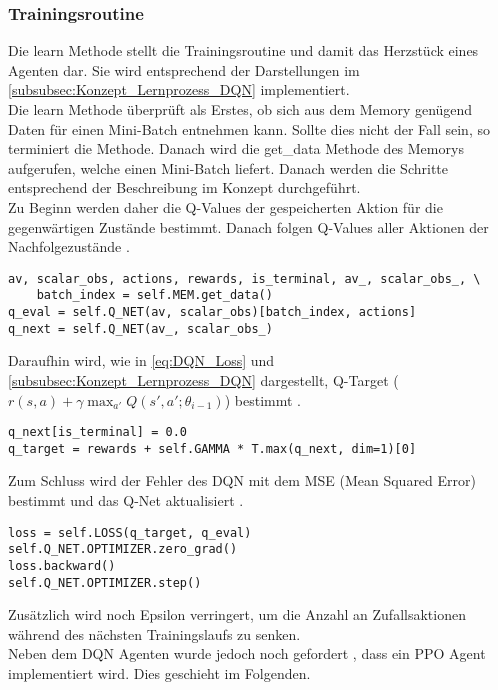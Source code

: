 \subsubsection{Trainingsroutine} \label{subsubsec:Implementierung_Trainingsroutine_DQN}
Die learn Methode stellt die Trainingsroutine und damit das Herzstück eines Agenten dar. Sie wird entsprechend der Darstellungen im \autoref{subsubsec:Konzept_Lernprozess_DQN} implementiert.\\
Die learn Methode überprüft als Erstes, ob sich aus dem Memory genügend Daten für einen Mini-Batch entnehmen kann. Sollte dies nicht der Fall sein, so terminiert die Methode.
Danach wird die get\_data Methode des Memorys aufgerufen, welche einen Mini-Batch liefert. Danach werden die Schritte entsprechend der Beschreibung im Konzept  durchgeführt.\\
Zu Beginn werden daher die Q-Values der gespeicherten Aktion für die gegenwärtigen Zustände bestimmt. Danach folgen Q-Values aller Aktionen der Nachfolgezustände .
\begin{lstlisting}[caption=Bestimmung der Q-Values, label=code:Bestimmung_Q-Values, style=Python]
av, scalar_obs, actions, rewards, is_terminal, av_, scalar_obs_, \
	batch_index = self.MEM.get_data()
q_eval = self.Q_NET(av, scalar_obs)[batch_index, actions]
q_next = self.Q_NET(av_, scalar_obs_)
\end{lstlisting}
Daraufhin wird, wie in \autoref{eq:DQN_Loss} und \autoref{subsubsec:Konzept_Lernprozess_DQN} dargestellt, Q-Target ($r(s,a) +\gamma \max_{a'}Q(s',a';\theta_{i-1})$) bestimmt .
\begin{lstlisting}[caption=Bestimmung von Q-Target, label=code:Bestimmung_Q-Target, style=Python]
q_next[is_terminal] = 0.0
q_target = rewards + self.GAMMA * T.max(q_next, dim=1)[0]
\end{lstlisting}
Zum Schluss wird der Fehler des DQN mit dem MSE (Mean Squared Error) bestimmt und das Q-Net aktualisiert .
\begin{lstlisting}[caption=Bestimmung des DQN Loss \& Update des Q-Networks, label=code:Bestimmung_DQN-Loss, style=Python]
loss = self.LOSS(q_target, q_eval)
self.Q_NET.OPTIMIZER.zero_grad()
loss.backward()
self.Q_NET.OPTIMIZER.step()
\end{lstlisting}
Zusätzlich wird noch Epsilon verringert, um die Anzahl an Zufallsaktionen während des nächsten Trainingslaufs zu senken.\\
Neben dem DQN Agenten wurde jedoch noch gefordert \fullref{subsec:Anforderungen_Diversität}, dass ein PPO Agent implementiert wird. Dies geschieht im Folgenden.

